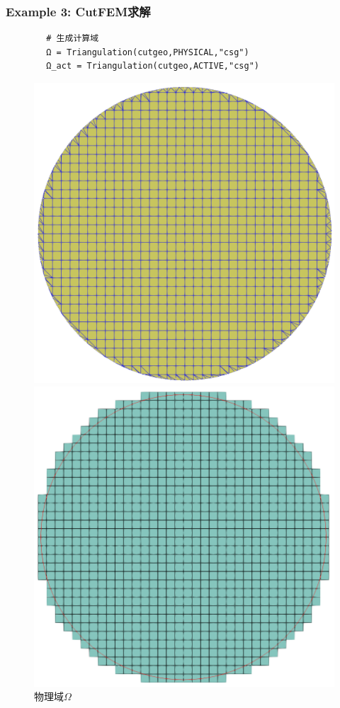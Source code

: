 \documentclass[lang=en,aspectratio=43,theme=default,logo=on]{simplebeamer}
\begin{document}
\begin{frame}[fragile]
    \frametitle{Example 3: CutFEM求解}
    \begin{verbatim}
        # 生成计算域
        Ω = Triangulation(cutgeo,PHYSICAL,"csg")
        Ω_act = Triangulation(cutgeo,ACTIVE,"csg")
    \end{verbatim}
    \begin{figure}
        \centering %
        \begin{minipage}[t]{0.5\linewidth}
            \centering
            \includegraphics[height=0.5\textheight]{./img/006.png}
            \caption{物理域$\Omega$}
        \end{minipage}%
        \begin{minipage}[t]{0.5\linewidth}
            \centering
            \includegraphics[height=0.5\textheight]{./img/007.png}

\end{minipage}
\end{figure}
\end{frame}
\end{document}
